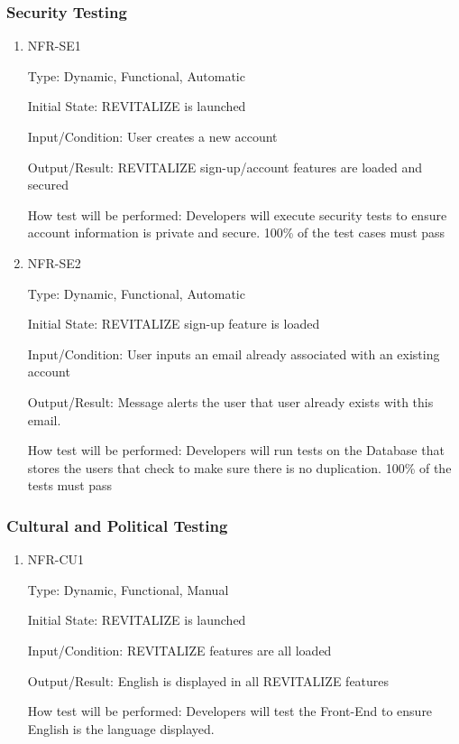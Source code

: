 \documentclass[12pt, titlepage]{article}
\begin{document}
\subsubsection{Security Testing}

\begin{enumerate}
	
	\item{NFR-SE1\\}
	
	Type: Dynamic, Functional, Automatic
	
	Initial State: REVITALIZE is launched
	
	Input/Condition: User creates a new account
	
	Output/Result: REVITALIZE sign-up/account features are loaded and secured  
	
	How test will be performed: Developers will execute security tests to ensure account information is private and secure. 100\% of the test cases must pass
	
	\item{NFR-SE2\\}
	
	Type: Dynamic, Functional, Automatic
	
	Initial State: REVITALIZE sign-up feature is loaded 
	
	Input/Condition: User inputs an email already associated with an existing account
	
	Output/Result: Message alerts the user that user already exists with this email.  
	
	How test will be performed: Developers will run tests on the Database that stores the users that check to make sure there is no duplication. 100\% of the tests must pass  
	
\end{enumerate}

\subsubsection{Cultural and Political Testing}

\begin{enumerate}
	
	\item{NFR-CU1\\}
	
	Type: Dynamic, Functional, Manual
	
	Initial State: REVITALIZE is launched
	
	Input/Condition: REVITALIZE features are all loaded
	
	Output/Result: English is displayed in all REVITALIZE features
	
	How test will be performed: Developers will test the Front-End to ensure English is the language displayed. 
	
	
\end{enumerate}
\end{document}
